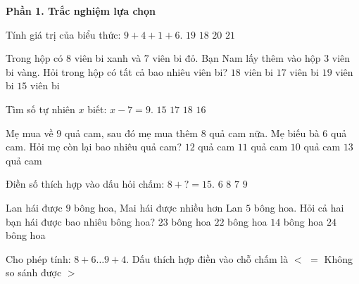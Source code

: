 \textbf{Phần 1. Trắc nghiệm lựa chọn}

\begin{ex} %
Tính giá trị của biểu thức: $9 + 4 + 1 + 6$.
\choice
{$19$}
{$18$}
{\True $20$}
{$21$}
\end{ex}

\begin{ex} %
Trong hộp có $8$ viên bi xanh và $7$ viên bi đỏ. Bạn Nam lấy thêm vào hộp $3$ viên bi vàng. Hỏi trong hộp có tất cả bao nhiêu viên bi?
\choice
{\True $18$ viên bi}
{$17$ viên bi}
{$19$ viên bi}
{$15$ viên bi}
\end{ex}

\begin{ex} %
Tìm số tự nhiên $x$ biết: $x - 7 = 9$.
\choice
{$15$}
{$17$}
{$18$}
{\True $16$}
\end{ex}

\begin{ex} %
Mẹ mua về $9$ quả cam, sau đó mẹ mua thêm $8$ quả cam nữa. Mẹ biếu bà $6$ quả cam. Hỏi mẹ còn lại bao nhiêu quả cam?
\choice
{$12$ quả cam}
{\True $11$ quả cam}
{$10$ quả cam}
{$13$ quả cam}
\end{ex}

\begin{ex} %
Điền số thích hợp vào dấu hỏi chấm: $8 + ? = 15$.
\choice
{$6$}
{$8$}
{\True $7$}
{$9$}
\end{ex}

\begin{ex} %
Lan hái được $9$ bông hoa, Mai hái được nhiều hơn Lan $5$ bông hoa. Hỏi cả hai bạn hái được bao nhiêu bông hoa?
\choice
{\True $23$ bông hoa}
{$22$ bông hoa}
{$14$ bông hoa}
{$24$ bông hoa}
\end{ex}

\begin{ex} %
Cho phép tính: $8 + 6 \dots 9 + 4$. Dấu thích hợp điền vào chỗ chấm là
\choice
{$<$}
{$=$}
{Không so sánh được}
{\True $>$}
\end{ex}

